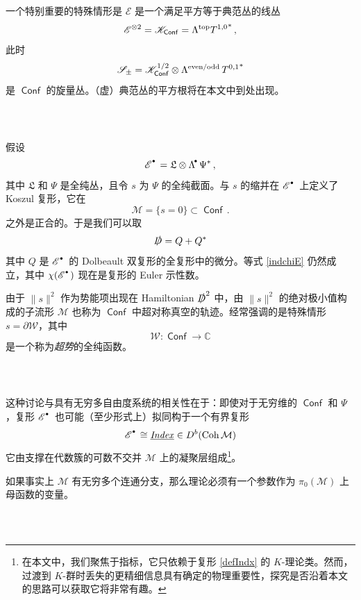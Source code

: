 \documentclass[12pt]{article}
\newcommand{\C}{\mathbb{C}}
\newcommand{\cM}{\mathcal{M}}
\DeclareMathOperator{\Coh}{Coh}
\DeclareMathOperator{\Conf}{\mathsf{Conf}}
\newcommand{\cE}{\mathscr{E}}
\newcommand{\cK}{\mathscr{K}}
\newcommand{\Dir}{\slashed D}
\newcommand{\frL}{\mathfrak{L}}
\newcommand{\cW}{\mathscr{W}}
\newcommand{\Ld}{{\Lambda}^{\!\raisebox{0.5mm}{$\scriptscriptstyle \bullet$}\,}}
\newcommand{\Ed}{{\cE}^{\raisebox{0.5mm}{$\scriptscriptstyle \bullet$}\,}}
\newcommand{\Indx}{\underline{\mathit{Index}}}
\theoremstyle{definition}
\begin{document}
\subsubsection{\ }\label{s_Spinor}

一个特别重要的特殊情形是 $\cE$ 是一个满足平方等于典范丛的线丛
$$
\cE^{\otimes 2} = \cK_{\Conf} =  \Lambda^{\textup{top}} {T^{1,0}}^* \,,
$$
此时
$$
\mathscr{S}_{\pm} = \cK_{\Conf}^{1/2} \otimes \Lambda^{\textup{even/odd}} \, {T^{0,1}}^*
$$
是 $\Conf$ 的旋量丛。（虚）典范丛的平方根将在本文中到处出现。

\subsubsection{\ }

假设
$$
\Ed = \frL \otimes \Ld \Psi^*\,,
$$
其中 $\frL$ 和 $\Psi$ 是全纯丛，且令 $s$ 为 $\Psi$ 的全纯截面。与 $s$ 的缩并在 $\Ed$ 上定义了 Koszul 复形，它在
\begin{equation}
\cM = \{s = 0 \}  \subset \Conf \,. \label{defcM}
\end{equation}
之外是正合的。于是我们可以取
$$
\Dir = Q  + Q^*
$$
其中 $Q$ 是 $\Ed$ 的 Dolbeault 双复形的全复形中的微分。等式 \eqref{indchiE} 仍然成立，其中 $\chi(\Ed)$ 现在是复形的 Euler 示性数。

由于 $\|s\|^2$ 作为势能项出现在 Hamiltonian $\Dir^2$ 中，由 $\|s\|^2$ 的绝对极小值构成的子流形 $\cM$ 也称为 $\Conf$ 中超对称真空的轨迹。经常强调的是特殊情形 $s=\partial \cW$，其中
$$
\cW : \Conf \to \C
$$
是一个称为\emph{超势}的全纯函数。

\subsubsection{\ }

这种讨论与具有无穷多自由度系统的相关性在于：即使对于无穷维的 $\Conf$ 和 $\Psi$，复形 $\Ed$ 也可能（至少形式上）拟同构于一个有界复形
\begin{equation}
\Ed \cong \Indx \in D^b(\Coh \cM) \label{defIndx}
\end{equation}
它由支撑在代数簇的可数不交并 $\cM$ 上的凝聚层组成\footnote{在本文中，我们聚焦于指标，它只依赖于复形 \eqref{defIndx} 的 $K$-理论类。然而，过渡到 $K$-群时丢失的更精细信息具有确定的物理重要性，探究是否沿着本文的思路可以获取它将非常有趣。}。

如果事实上 $\cM$ 有无穷多个连通分支，那么理论必须有一个参数作为 $\pi_0(\cM)$ 上母函数的变量。

\subsubsection{\ }
\end{document}
